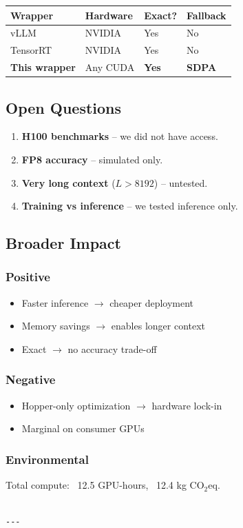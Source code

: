 \begin{table}[H]
\centering
\small
\begin{tabular}{llll}
\toprule
\textbf{Wrapper} & \textbf{Hardware} & \textbf{Exact?} & \textbf{Fallback} \\
\midrule
vLLM & NVIDIA & Yes & No \\
TensorRT & NVIDIA & Yes & No \\
\textbf{This wrapper} & Any CUDA & \textbf{Yes} & \textbf{SDPA} \\
\bottomrule
\end{tabular}
\end{table}

\subsection{Open Questions}

\begin{enumerate}
\item \textbf{H100 benchmarks} -- we did not have access.
\item \textbf{FP8 accuracy} -- simulated only.
\item \textbf{Very long context} ($L > 8192$) -- untested.
\item \textbf{Training vs inference} -- we tested inference only.

\end{enumerate}
\subsection{Broader Impact}

\subsubsection{Positive}
\begin{itemize}
\item Faster inference $\to$ cheaper deployment
\item Memory savings $\to$ enables longer context
\item Exact $\to$ no accuracy trade-off

\end{itemize}
\subsubsection{Negative}
\begin{itemize}
\item Hopper-only optimization $\to$ hardware lock-in
\item Marginal on consumer GPUs

\end{itemize}
\subsubsection{Environmental}
Total compute: ~12.5 GPU-hours, ~12.4 kg CO$_2$eq.
\begin{lstlisting}

---
\end{lstlisting}
